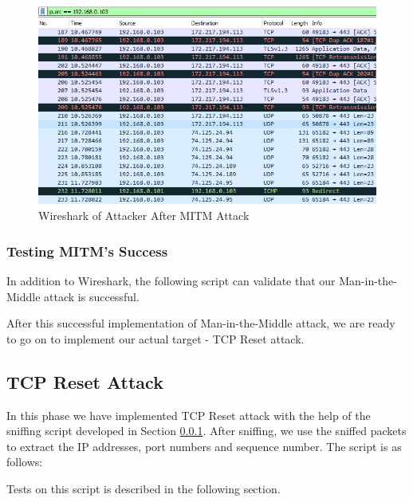 \documentclass[14pt]{extarticle}
\begin{document}
            \begin{figure}
                \centering
                \includegraphics[width=.95\textwidth]{Pictures/MITM_Gateway/AfterMITM_Attacker.png}
                \caption{Wireshark of Attacker After MITM Attack}
                \label{fig:MITM_Local_Wireshark}
            \end{figure}
     
        \subsubsection{Testing MITM's Success}
            \label{sec:sniff}
            In addition to Wireshark, the following script can validate that our Man-in-the-Middle attack is successful. 
            
            
            
            After this successful implementation of Man-in-the-Middle attack, we are ready to go on to implement our actual target - TCP Reset attack.
    
    
    
    \subsection{TCP Reset Attack}
        \label{sec:rst_script}
    
        In this phase we have implemented TCP Reset attack with the help of the sniffing script developed in Section \ref{sec:sniff}. After sniffing, we use the sniffed packets to extract the IP addresses, port numbers and sequence number. The script is as follows:
        
        
        
        Tests on this script is described in the following section.
        
\end{document}
